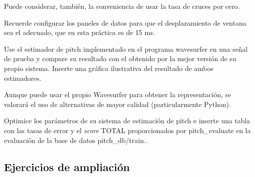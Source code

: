 \begin{DoxyItemize}
\begin{DoxyItemize}
\begin{DoxyItemize}
Puede considerar, también, la conveniencia de usar la tasa de cruces por cero.

Recuerde configurar los paneles de datos para que el desplazamiento de ventana sea el adecuado, que en esta práctica es de 15 ms.
\item Use el estimador de pitch implementado en el programa {\ttfamily wavesurfer} en una señal de prueba y compare su resultado con el obtenido por la mejor versión de su propio sistema. Inserte una gráfica ilustrativa del resultado de ambos estimadores.

Aunque puede usar el propio Wavesurfer para obtener la representación, se valorará el uso de alternativas de mayor calidad (particularmente Python).
\end{DoxyItemize}
\item Optimice los parámetros de su sistema de estimación de pitch e inserte una tabla con las tasas de error y el {\itshape score} T\+O\+T\+AL proporcionados por {\ttfamily pitch\+\_\+evaluate} en la evaluación de la base de datos {\ttfamily pitch\+\_\+db/train}..
\end{DoxyItemize}
\end{DoxyItemize}

\subsection*{Ejercicios de ampliación }


